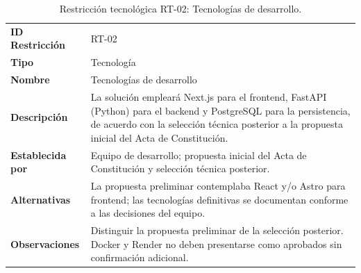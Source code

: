 \documentclass[11pt,a4paper,oneside]{article}
\begin{document}
\begingroup
\small
\setlength{\tabcolsep}{7pt}
\renewcommand{\arraystretch}{1.30}
\setlength{\anchoRegistro}{\dimexpr\textwidth-4\tabcolsep-3\arrayrulewidth\relax}
\begin{table}[H]
\centering
\caption{Restricción tecnológica RT-02: Tecnologías de desarrollo.}
\label{tab:restriccion-rt-02}
\begin{tabular}{|
>{\RaggedRight\arraybackslash}p{.28\anchoRegistro}|
>{\RaggedRight\arraybackslash}p{.72\anchoRegistro}|}
\hline
\rowcolor{negroTabla}
\multicolumn{2}{|l|}{\color{white}\bfseries Registro de Restricción Tecnológica}\\\hline
\cellcolor{azulTabla}\bfseries ID Restricción
& RT-02\\\hline
\cellcolor{azulTabla}\bfseries Tipo
& Tecnología\\\hline
\cellcolor{azulTabla}\bfseries Nombre
& Tecnologías de desarrollo\\\hline
\cellcolor{azulTabla}\bfseries Descripción
& La solución empleará Next.js para el frontend, FastAPI (Python) para el backend y PostgreSQL para la persistencia, de acuerdo con la selección técnica posterior a la propuesta inicial del Acta de Constitución.\\\hline
\cellcolor{azulTabla}\bfseries Establecida por
& Equipo de desarrollo; propuesta inicial del Acta de Constitución y selección técnica posterior.\\\hline
\cellcolor{azulTabla}\bfseries Alternativas
& La propuesta preliminar contemplaba React y/o Astro para frontend; las tecnologías definitivas se documentan conforme a las decisiones del equipo.\\\hline
\cellcolor{azulTabla}\bfseries Observaciones
& Distinguir la propuesta preliminar de la selección posterior. Docker y Render no deben presentarse como aprobados sin confirmación adicional.\\\hline
\end{tabular}
\end{table}
\endgroup
\end{document}
